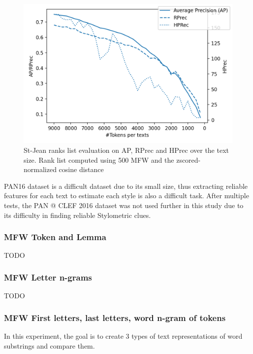 \begin{figure}
  \centering
  \includegraphics[width=\linewidth]{img/degradation.png}
  \caption{St-Jean ranks list evaluation on AP, RPrec and HPrec over the text size. Rank list computed using 500 MFW and the zscored-normalized cosine distance}
  \label{img:degradation}
\end{figure}

PAN16 dataset is a difficult dataset due to its small size, thus extracting reliable features for each text to estimate each style is also a difficult task.
After multiple tests, the PAN @ CLEF 2016 dataset was not used further in this study due to its difficulty in finding reliable Stylometric clues.

\subsubsection{MFW Token and Lemma}

TODO

\subsubsection{MFW Letter n-grams}

TODO

\subsubsection{MFW First letters, last letters, word n-gram of tokens}

In this experiment, the goal is to create 3 types of text representations of word substrings and compare them.

